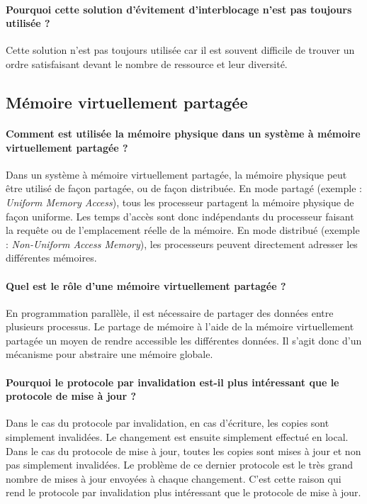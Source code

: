 \documentclass[a4paper]{article}
\begin{document}
\paragraph{Pourquoi cette solution d'évitement d'interblocage n'est pas toujours utilisée ?}
Cette solution n'est pas toujours utilisée car il est souvent difficile de trouver un ordre satisfaisant devant le nombre de ressource et leur diversité.

\subsection{Mémoire virtuellement partagée}

\paragraph{Comment est utilisée la mémoire physique dans un système à mémoire virtuellement partagée ?}
Dans un système à mémoire virtuellement partagée, la mémoire physique peut être utilisé de façon partagée, ou de façon distribuée. En mode partagé (exemple : \textit{Uniform Memory Access}), tous les processeur partagent la mémoire physique de façon uniforme. Les temps d'accès sont donc indépendants du processeur faisant la requête ou de l'emplacement réelle de la mémoire. En mode distribué (exemple : \textit{Non-Uniform Access Memory}), les processeurs peuvent directement adresser les différentes mémoires.

\paragraph{Quel est le rôle d'une mémoire virtuellement partagée ?}
En programmation parallèle, il est nécessaire de partager des données entre plusieurs processus. Le partage de mémoire à l'aide de la mémoire virtuellement partagée un moyen de rendre accessible les différentes données. Il s'agit donc d'un mécanisme pour abstraire une mémoire globale.

\paragraph{Pourquoi le protocole par invalidation est-il plus intéressant que le protocole de mise à jour ?}
Dans le cas du protocole par invalidation, en cas d'écriture, les copies sont simplement invalidées. Le changement est ensuite simplement effectué en local. Dans le cas du protocole de mise à jour, toutes les copies sont mises à jour et non pas simplement invalidées. Le problème de ce dernier protocole est le très grand nombre de mises à jour envoyées à chaque changement. C'est cette raison qui rend le protocole par invalidation plus intéressant que le protocole de mise à jour.
\end{document}

